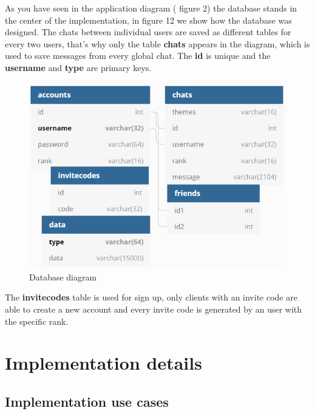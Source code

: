 \documentclass[runningheads]{llncs}
\begin{document}
\par As you have seen in the application diagram ( figure 2) the database stands in the center of the implementation, in figure 12 we show how the database was designed. The chats between individual users are saved as different tables for every two users, that's why only the table \textbf{chats} appears in the diagram, which is used to save messages from every global chat. The \textbf{id} is unique and the \textbf{username} and
\textbf{type} are primary keys.

\begin{figure}[H]
\includegraphics[width=\textwidth,height=\textheight,keepaspectratio]{images/dbdiagram.png}
\caption{Database diagram}
\end{figure}


\par The \textbf{invitecodes} table is used for sign up, only clients with an invite code are able to create a new account and every invite code is generated by an user with the specific rank.

\newpage
\section{Implementation details}

\subsection{Implementation use cases}
\end{document}
